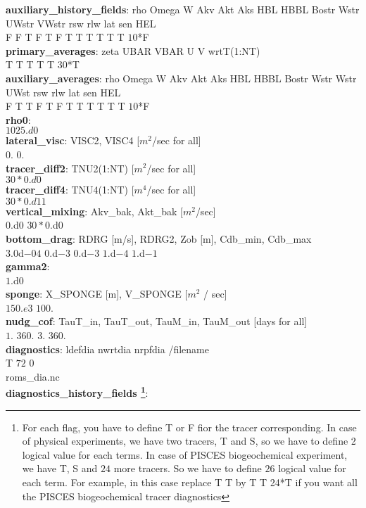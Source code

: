 \textbf{auxiliary\_history\_fields}:   rho Omega  W  Akv  Akt  Aks  HBL HBBL Bostr Wstr UWstr VWstr rsw rlw lat sen HEL \\
F   F     T   F    T    F    T   T    T     T    T    T $10$*F \\
\textbf{primary\_averages}: zeta UBAR VBAR  U  V   wrtT(1:NT) \\
T    T    T    T  T   $30$*T      \\
\textbf{auxiliary\_averages}: rho Omega  W  Akv  Akt  Aks  HBL HBBL Bostr Wstr Wstr UWst  rsw rlw lat sen HEL \\
F   T     T   F    T    F    T   T    T     T   T    T     $10$*F\\
\textbf{rho0}: \\
$1025.d0$ \\
\textbf{lateral\_visc}:   VISC2,    VISC4    [$m^{2}$/sec for all] \\
$0.$       $0.$\\
\textbf{tracer\_diff2}: TNU2(1:NT)           [$m^2$/sec for all] \\
$30*0.d0$ \\
\textbf{tracer\_diff4}: TNU4(1:NT)           [$m^4$/sec for all] \\
$30*0.d11$ \\
\textbf{vertical\_mixing}: Akv\_bak, Akt\_bak [$m^2$/sec] \\
$0.$d$0$    $30*0.$d$0$ \\
\textbf{bottom\_drag}:     RDRG [m/s],  RDRG2,  Zob [m],  Cdb\_min, Cdb\_max \\
$3.0$d$-04$ $0.$d$-3$ $0$.d$-3$ $1$.d$-4$ $1$.d$-1$
\\
\textbf{gamma2}: \\
$1.$d$0$ \\
\textbf{sponge}:          X\_SPONGE [m],    V\_SPONGE [$m^2$ / sec] \\
$150.e3$           $100.$ \\
\textbf{nudg\_cof}:    TauT\_in, TauT\_out, TauM\_in, TauM\_out  [days for all]\\
$1.$       $360.$      $3.$      $360.$ \\
\textbf{diagnostics}:   ldefdia   nwrtdia    nrpfdia /filename \\
T        $72$         $0$ \\
roms\_dia.nc \\
\textbf{diagnostics\_history\_fields \footnote{For each flag, you have to define T or
    F fior the tracer corresponding. In case of physical experiments, we have two
    tracers, T and S, so we have to define 2 logical value for each terms. In case of
    PISCES biogeochemical experiment, we have T, S and $24$ more tracers. So we have
    to define $26$ logical value for each term. For example, in this case replace T T
    by T T 24*T if you want all the PISCES biogeochemical tracer diagnostics}}:
